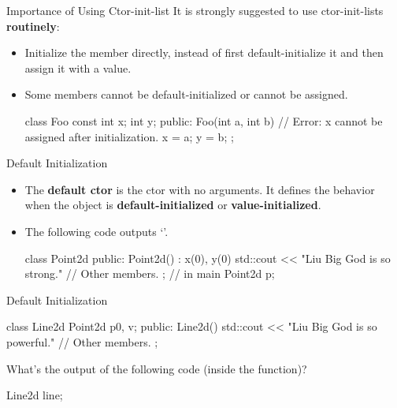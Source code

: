 \documentclass{beamer}
\begin{document}
\begin{frame}[fragile]{Importance of Using Ctor-init-list}
    It is strongly suggested to use ctor-init-lists \textbf{routinely}:
    \begin{itemize}
        \item Initialize the member directly, instead of first default-initialize it and then assign it with a value.
        \item Some members cannot be default-initialized or cannot be assigned.
        \begin{cpp}
class Foo {
  const int x;
  int y;
 public:
  Foo(int a, int b) {
    // Error: x cannot be assigned after initialization.
    x = a;
    y = b;
  }
};
        \end{cpp}
    \end{itemize}
\end{frame}

\begin{frame}[fragile]{Default Initialization}
    \begin{itemize}
        \item The \textbf{default ctor} is the ctor with no arguments. It defines the behavior when the object is \textbf{default-initialized} or \textbf{value-initialized}.
        \item The following code outputs `'.
        \begin{cpp}
class Point2d {
 public:
  Point2d() : x(0), y(0) {
    std::cout << "Liu Big God is so strong.\n"
  }
  // Other members.
};
// in main
Point2d p;
        \end{cpp}
    \end{itemize}
\end{frame}

\begin{frame}[fragile]{Default Initialization}
    \begin{cpp}
class Line2d {
  Point2d p0, v;
 public:
  Line2d()
    { std::cout << "Liu Big God is so powerful.\n" }
  // Other members.
};
    \end{cpp}
    What's the output of the following code (inside the  function)?
    \begin{cpp}
Line2d line;
    \end{cpp}
    \\
    \\
\end{frame}
\end{document}
